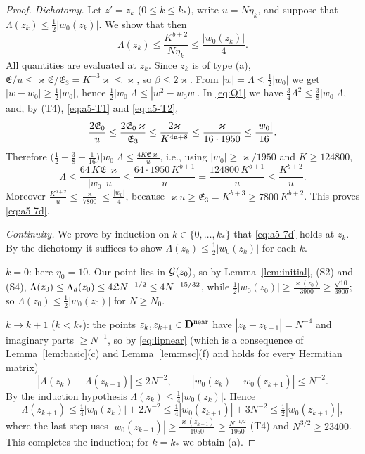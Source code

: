 \begin{proof}
\smallskip\noindent\emph{Dichotomy.} Let $z'=z_k$ ($0\le k\le k_*$), write $u=N\eta_k$, and suppose that $\Lambda(z_k)\le\frac12|w_0(z_k)|$. We show that then
\begin{equation}\tag{7.d}\label{eq:a5-7d}
 \Lambda(z_k)\le\frac{K^{b+2}}{N\eta_k}\le\frac{|w_0(z_k)|}4 .
\end{equation}
All quantities are evaluated at $z_k$. Since $z_k$ is of type (a), $\mathfrak E/u\le\varkappa\mathfrak E/\mathfrak E_3=K^{-3}\varkappa\le\varkappa$, so $\beta\le2\varkappa$. From $|w|=\Lambda\le\frac12|w_0|$ we get $|w-w_0|\ge\frac12|w_0|$, hence $\frac12|w_0|\Lambda\le|w^2-w_0w|$.
In \eqref{eq:Q1} we have $\frac34\Lambda^2\le\frac38|w_0|\Lambda$, and, by (T4), \eqref{eq:a5-T1} and \eqref{eq:a5-T2},
\[
 \frac{2\mathfrak E_0}{u}\le\frac{2\mathfrak E_0\,\varkappa}{\mathfrak E_3}\le\frac{2\varkappa}{K^{4\mathfrak{a}+8}}\le\frac{\varkappa}{16\cdot1950}\le\frac{|w_0|}{16}.
\]
Therefore $\big(\frac12-\frac38-\frac1{16}\big)|w_0|\Lambda\le\frac{4K\mathfrak E\varkappa}{u}$, i.e., using $|w_0|\ge\varkappa/1950$ and $K\ge124800$,
\[
 \Lambda\le\frac{64\,K\mathfrak E\,\varkappa}{|w_0|\,u}\le\frac{64\cdot1950\,K^{b+1}}{u}=\frac{124800\,K^{b+1}}{u}\le\frac{K^{b+2}}{u}.
\]
Moreover $\frac{K^{b+2}}{u}\le\frac{\varkappa}{7800}\le\frac{|w_0|}4$, because $\varkappa u\ge\mathfrak E_3=K^{b+3}\ge7800\,K^{b+2}$. This proves \eqref{eq:a5-7d}.

\smallskip\noindent\emph{Continuity.} We prove by induction on $k\in\{0,\dots,k_*\}$ that \eqref{eq:a5-7d} holds at $z_k$. By the dichotomy it suffices to show $\Lambda(z_k)\le\frac12|w_0(z_k)|$ for each $k$.

$k=0$: here $\eta_0=10$. Our point lies in $\mathcal{G}(z_0)$, so by Lemma~\ref{lem:initial}, (S2) and (S4), $\Lambda(z_0)\le\Lambda_d(z_0)\le4\mathfrak{L} N^{-1/2}\le4N^{-15/32}$, while $\frac12|w_0(z_0)|\ge\frac{\varkappa(z_0)}{3900}\ge\frac{\sqrt{10}}{3900}$; so $\Lambda(z_0)\le\frac12|w_0(z_0)|$ for $N\ge N_0$.

$k\to k+1$ ($k<k_*$): the points $z_k,z_{k+1}\in\mathbf{D}^{\rm near}$ have $|z_k-z_{k+1}|=N^{-4}$ and imaginary parts $\ge N^{-1}$, so by \eqref{eq:lipnear} (which is a consequence of Lemma~\ref{lem:basic}(c) and Lemma~\ref{lem:msc}(f) and holds for every Hermitian matrix)
\[
 |\Lambda(z_k)-\Lambda(z_{k+1})|\le2N^{-2},\qquad|w_0(z_k)-w_0(z_{k+1})|\le N^{-2}.
\]
By the induction hypothesis $\Lambda(z_k)\le\frac14|w_0(z_k)|$. Hence
\[
 \Lambda(z_{k+1})\le\tfrac14|w_0(z_k)|+2N^{-2}\le\tfrac14|w_0(z_{k+1})|+3N^{-2}\le\tfrac12|w_0(z_{k+1})|,
\]
where the last step uses $|w_0(z_{k+1})|\ge\frac{\varkappa(z_{k+1})}{1950}\ge\frac{N^{-1/2}}{1950}$ (T4) and $N^{3/2}\ge23400$. This completes the induction; for $k=k_*$ we obtain (a).


\end{proof}
